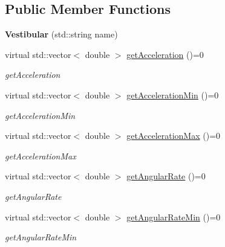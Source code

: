 \subsection*{Public Member Functions}
\begin{DoxyCompactItemize}
\item 
\hypertarget{classdrobot_1_1device_1_1vestibular_1_1Vestibular_a29c17eac2af0c2e974d3531b8d53a3aa}{{\bfseries Vestibular} (std\-::string name)}\label{classdrobot_1_1device_1_1vestibular_1_1Vestibular_a29c17eac2af0c2e974d3531b8d53a3aa}

\item 
virtual std\-::vector$<$ double $>$ \hyperlink{classdrobot_1_1device_1_1vestibular_1_1Vestibular_a603a1a556bc01d05fbcdc152fcac187e}{get\-Acceleration} ()=0
\begin{DoxyCompactList}\small\item\em get\-Acceleration \end{DoxyCompactList}\item 
virtual std\-::vector$<$ double $>$ \hyperlink{classdrobot_1_1device_1_1vestibular_1_1Vestibular_aa8b4a963dabe11f217e6ec3f589b67c9}{get\-Acceleration\-Min} ()=0
\begin{DoxyCompactList}\small\item\em get\-Acceleration\-Min \end{DoxyCompactList}\item 
virtual std\-::vector$<$ double $>$ \hyperlink{classdrobot_1_1device_1_1vestibular_1_1Vestibular_a373ed8304b4dce771493da5a1a88de81}{get\-Acceleration\-Max} ()=0
\begin{DoxyCompactList}\small\item\em get\-Acceleration\-Max \end{DoxyCompactList}\item 
virtual std\-::vector$<$ double $>$ \hyperlink{classdrobot_1_1device_1_1vestibular_1_1Vestibular_adcd46ff2d7971a57550b4221c268eb93}{get\-Angular\-Rate} ()=0
\begin{DoxyCompactList}\small\item\em get\-Angular\-Rate \end{DoxyCompactList}\item 
virtual std\-::vector$<$ double $>$ \hyperlink{classdrobot_1_1device_1_1vestibular_1_1Vestibular_ad49879a49bf891eaf8aa31127a05f69c}{get\-Angular\-Rate\-Min} ()=0
\begin{DoxyCompactList}\small\item\em get\-Angular\-Rate\-Min \end{DoxyCompactList}\item 

\end{DoxyCompactItemize}
